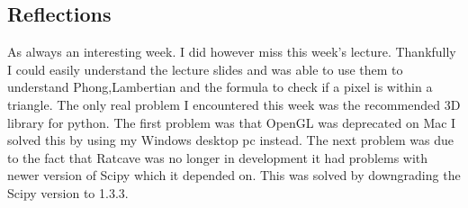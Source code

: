 \documentclass{article}
\begin{document}
\subsection{Reflections}
As always an interesting week. I did however miss this week's lecture. Thankfully I could easily understand the lecture slides and was able to use them to understand Phong,Lambertian and the formula to check if a pixel is within a triangle. The only real problem I encountered this week was the recommended 3D library for python. The first problem was that OpenGL was deprecated on Mac I solved this by using my Windows desktop pc instead. The next problem was due to the fact that Ratcave was no longer in development it had problems with newer version of Scipy which it depended on. This was solved by downgrading the Scipy version to 1.3.3.


    \newpage
    \printbibliography
\end{document}
